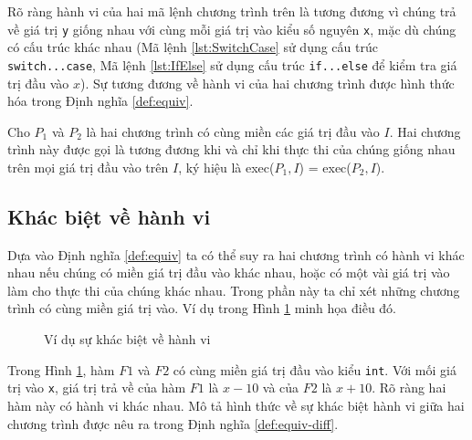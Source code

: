 Rõ ràng hành vi của hai mã lệnh chương trình trên là tương đương vì
chúng trả về giá trị \texttt{y} giống nhau với cùng mỗi giá trị vào
kiểu số nguyên \texttt{x}, mặc dù chúng có cấu trúc khác nhau (Mã lệnh
\ref{lst:SwitchCase} sử dụng cấu trúc \texttt{switch...case}, Mã lệnh
\ref{lst:IfElse} sử dụng cấu trúc \texttt{if...else} để kiểm tra giá
trị đầu vào $x$). Sự tương đương về hành vi của hai chương trình được
hình thức hóa trong Định nghĩa \ref{def:equiv}.

\begin{definition}
  \label{def:equiv}
  Cho $P_{1}$ và $P_{2}$ là hai chương trình có cùng miền các giá trị
  đầu vào $I$. Hai chương trình này được gọi là tương đương khi và chỉ
  khi thực thi của chúng giống nhau trên mọi giá trị đầu vào trên $I$,
  ký hiệu là exec($P_{1}, I$) = exec($P_{2}, I$).
\end{definition}
	
\subsection{Khác biệt về hành vi}

Dựa vào Định nghĩa \ref{def:equiv} ta có thể suy ra hai chương trình
có hành vi khác nhau nếu chúng có miền giá trị đầu vào khác nhau, hoặc
có một vài giá trị vào làm cho thực thi của chúng khác nhau. Trong
phần này ta chỉ xét những chương trình có cùng miền giá trị vào. Ví dụ trong Hình \ref{fig:behavioral-diff} minh họa điều đó.

\begin{figure}[h]
  \centering
  \caption{Ví dụ sự khác biệt về hành vi}
  \label{fig:behavioral-diff}
  \begin{minipage}[t]{0.45\linewidth}
    
  \end{minipage}%
\hfill\vrule\hfill
\begin{minipage}[t]{0.45\linewidth}
  
\end{minipage}%
\end{figure}

Trong Hình \ref{fig:behavioral-diff}, hàm $F1$ và $F2$ có cùng miền
giá trị đầu vào kiểu \texttt{int}. Với mối giá trị vào \texttt{x}, giá
trị trả về của hàm $F1$ là $x - 10$ và của $F2$ là $x + 10$. Rõ ràng
hai hàm này có hành vi khác nhau. Mô tả hình thức về sự khác biệt hành
vi giữa hai chương trình được nêu ra trong Định nghĩa
\ref{def:equiv-diff}.

